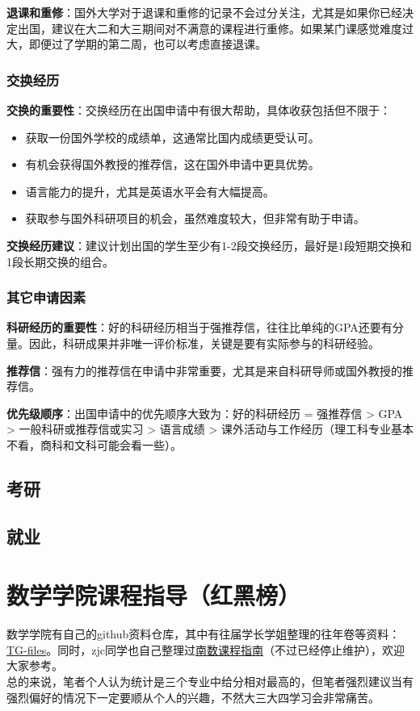 \documentclass[a4paper,11pt,notitlepage]{article}
\begin{document}
\textbf{退课和重修}：国外大学对于退课和重修的记录不会过分关注，尤其是如果你已经决定出国，建议在大二和大三期间对不满意的课程进行重修。如果某门课感觉难度过大，即便过了学期的第二周，也可以考虑直接退课。

\subsubsection{交换经历}

\textbf{交换的重要性}：交换经历在出国申请中有很大帮助，具体收获包括但不限于：
\begin{itemize}
    \item 获取一份国外学校的成绩单，这通常比国内成绩更受认可。
    \item 有机会获得国外教授的推荐信，这在国外申请中更具优势。
    \item 语言能力的提升，尤其是英语水平会有大幅提高。
    \item 获取参与国外科研项目的机会，虽然难度较大，但非常有助于申请。
\end{itemize}

\textbf{交换经历建议}：建议计划出国的学生至少有1-2段交换经历，最好是1段短期交换和1段长期交换的组合。

\subsubsection{其它申请因素}

\textbf{科研经历的重要性}：好的科研经历相当于强推荐信，往往比单纯的GPA还要有分量。因此，科研成果并非唯一评价标准，关键是要有实际参与的科研经验。

\textbf{推荐信}：强有力的推荐信在申请中非常重要，尤其是来自科研导师或国外教授的推荐信。

\textbf{优先级顺序}：出国申请中的优先顺序大致为：好的科研经历 = 强推荐信 > GPA > 一般科研或推荐信或实习 > 语言成绩 > 课外活动与工作经历（理工科专业基本不看，商科和文科可能会看一些）。

\subsection{考研}\label{考研}

\subsection{就业}\label{就业}

\section{数学学院课程指导（红黑榜）}\label{红黑榜}
数学学院有自己的github资料仓库，其中有往届学长学姐整理的往年卷等资料：\href{https://github.com/will-c137/TG-files.git}{TG-files}。同时，zjc同学也自己整理过\href{https://tg0.gitbook.io/tgbook}{南数课程指南}（不过已经停止维护），欢迎大家参考。\\
\indent 总的来说，笔者个人认为统计是三个专业中给分相对最高的，但笔者强烈建议当有强烈偏好的情况下一定要顺从个人的兴趣，不然大三大四学习会非常痛苦。
\end{document}
